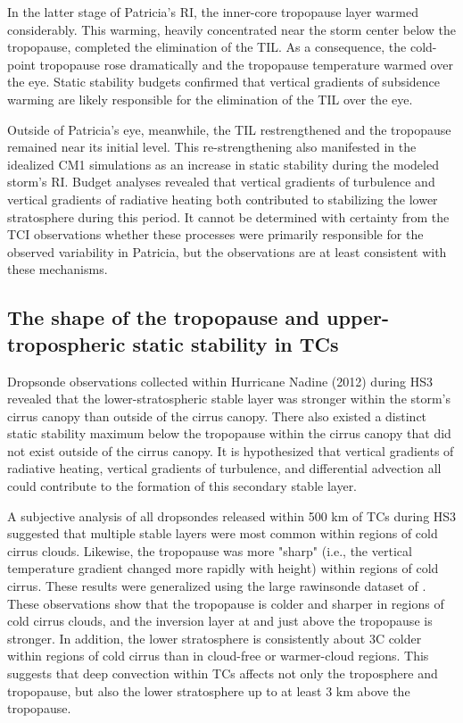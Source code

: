 In the latter stage of Patricia's RI, the inner-core tropopause layer warmed considerably.
This warming, heavily concentrated near the storm center below the tropopause, completed the elimination of the TIL.
As a consequence, the cold-point tropopause rose dramatically and the tropopause temperature warmed over the eye.
Static stability budgets confirmed that vertical gradients of subsidence warming are likely responsible for the elimination of the TIL over the eye.

Outside of Patricia's eye, meanwhile, the TIL restrengthened and the tropopause remained near its initial level.
This re-strengthening also manifested in the idealized CM1 simulations as an increase in static stability during the modeled storm's RI.
Budget analyses revealed that vertical gradients of turbulence and vertical gradients of radiative heating both contributed to stabilizing the lower stratosphere during this period.
It cannot be determined with certainty from the TCI observations whether these processes were primarily responsible for the observed variability in Patricia, but the observations are at least consistent with these mechanisms.

\subsection{The shape of the tropopause and upper-tropospheric static stability in TCs}

Dropsonde observations collected within Hurricane Nadine (2012) during HS3 revealed that the lower-stratospheric stable layer was stronger within the storm's cirrus canopy than outside of the cirrus canopy.
There also existed a distinct static stability maximum below the tropopause within the cirrus canopy that did not exist outside of the cirrus canopy.
It is hypothesized that vertical gradients of radiative heating, vertical gradients of turbulence, and differential advection all could contribute to the formation of this secondary stable layer.

A subjective analysis of all dropsondes released within 500 km of TCs during HS3 suggested that multiple stable layers were most common within regions of cold cirrus clouds.
Likewise, the tropopause was more "sharp" (i.e., the vertical temperature gradient changed more rapidly with height) within regions of cold cirrus.
These results were generalized using the large rawinsonde dataset of \cite{DuranMolinari2016}.
These observations show that the tropopause is colder and sharper in regions of cold cirrus clouds, and the inversion layer at and just above the tropopause is stronger.
In addition, the lower stratosphere is consistently about 3\textdegree{}C colder within regions of cold cirrus than in cloud-free or warmer-cloud regions.
This suggests that deep convection within TCs affects not only the troposphere and tropopause, but also the lower stratosphere up to at least 3 km above the tropopause.

